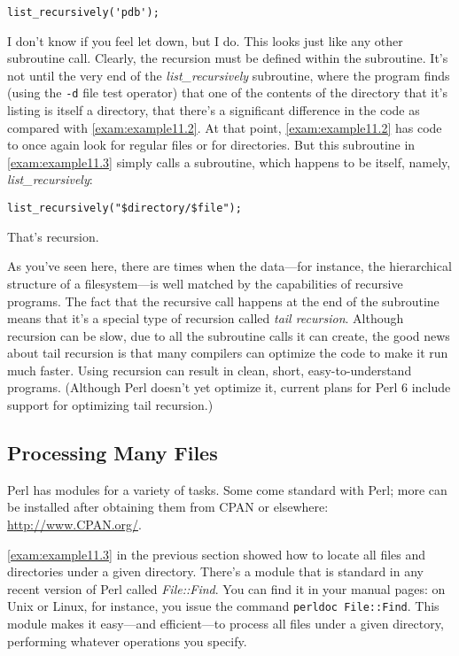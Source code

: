 \begin{lstlisting}
list_recursively('pdb');
\end{lstlisting}

I don't know if you feel let down, but I do. This looks just like any other subroutine call. Clearly, the recursion must be defined within the subroutine. It's not until the very end of the \textit{list\_recursively} subroutine, where the program finds (using the \verb|-d| file test operator) that one of the contents of the directory that it's listing is itself a directory, that there's a significant difference in the code as compared with \autoref{exam:example11.2}. At that point, \autoref{exam:example11.2} has code to once again look for regular files or for directories. But this subroutine in \autoref{exam:example11.3} simply calls a subroutine, which happens to be itself, namely, \textit{list\_recursively}: 

\begin{lstlisting}
list_recursively("$directory/$file");
\end{lstlisting}

That's recursion.

As you've seen here, there are times when the data—for instance, the hierarchical structure of a filesystem—is well matched by the capabilities of recursive programs. The fact that the recursive call happens at the end of the subroutine means that it's a special type of recursion called \textit{tail recursion}. Although recursion can be slow, due to all the subroutine calls it can create, the good news about tail recursion is that many compilers can optimize the code to make it run much faster. Using recursion can result in clean, short, easy-to-understand programs. (Although Perl doesn't yet optimize it, current plans for Perl 6 include support for optimizing tail recursion.) 

\subsection{Processing Many Files}
\label{sect:section11.2.3}
Perl has modules for a variety of tasks. Some come standard with Perl; more can be installed after obtaining them from CPAN or elsewhere: \href{http://www.CPAN.org/}{http://www.CPAN.org/}.

\autoref{exam:example11.3} in the previous section showed how to locate all files and directories under a given directory. There's a module that is standard in any recent version of Perl called \textit{File::Find}. You can find it in your manual pages: on Unix or Linux, for instance, you issue the command \verb|perldoc File::Find|. This module makes it easy—and efficient—to process all files under a given directory, performing whatever operations you specify.

